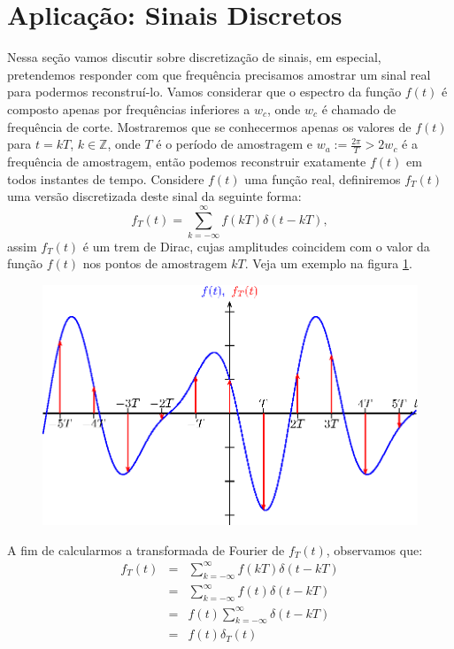 \section{Aplicação: Sinais Discretos}
Nessa seção vamos discutir sobre discretização de sinais, em especial, pretendemos responder com que frequência precisamos amostrar um sinal real para podermos reconstruí-lo. Vamos considerar que o espectro da função $f(t)$ é composto apenas por frequências inferiores a $w_c$, onde $w_c$ é chamado de frequência de corte. Mostraremos que se conhecermos apenas os valores de $f(t)$ para $t=kT$, $k\in\mathbb{Z}$, onde $T$ é o período de amostragem e $w_a:=\frac{2\pi }{T}>2w_c$  é a frequência de amostragem, então podemos reconstruir exatamente $f(t)$ em todos instantes de tempo.
Considere $f(t)$ uma função real, definiremos $f_T(t)$ uma versão discretizada deste sinal da seguinte forma:
\begin{equation}
f_T(t)=\sum_{k=-\infty}^\infty f(kT) \delta (t-kT),
\end{equation}
assim $f_T(t)$ é um trem de Dirac, cujas amplitudes coincidem com o valor da função $f(t)$ nos pontos de amostragem $kT$. Veja um exemplo na figura \ref{sinal_discreto}.
\begin{figure}[!ht]
\begin{center}
\includegraphics[width=\textwidth]{cap_propriedades_transformada/pics/figura_8}\end{center}
\caption{\label{sinal_discreto}}
\end{figure}
A fim de calcularmos a transformada de Fourier de $f_T(t)$, observamos que:
\begin{eqnarray*}
f_T(t)&=&\sum_{k=-\infty}^\infty f(kT) \delta (t-kT)\\
&=&\sum_{k=-\infty}^\infty f(t) \delta (t-kT)\\
&=&f(t)\sum_{k=-\infty}^\infty \delta (t-kT)\\
&=&f(t)\delta_T(t)
\end{eqnarray*}
